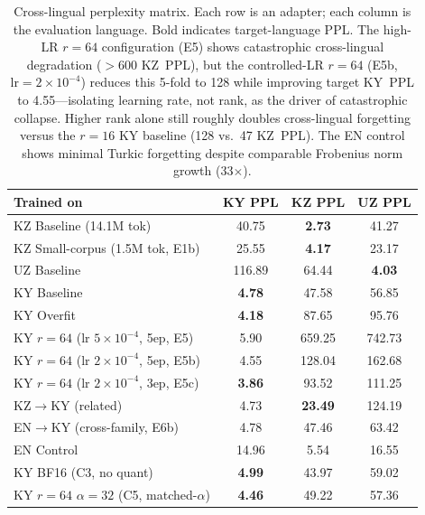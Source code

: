 \documentclass[11pt]{article}
\begin{document}
\begin{table}[t]
\centering
\small
\begin{tabular}{lccc}
\toprule
\textbf{Trained on} & \textbf{KY PPL} & \textbf{KZ PPL} & \textbf{UZ PPL} \\
\midrule
KZ Baseline (14.1M tok) & 40.75 & \textbf{2.73} & 41.27 \\
KZ Small-corpus (1.5M tok, E1b) & 25.55 & \textbf{4.17} & 23.17 \\
UZ Baseline & 116.89 & 64.44 & \textbf{4.03} \\
KY Baseline & \textbf{4.78} & 47.58 & 56.85 \\
KY Overfit & \textbf{4.18} & 87.65 & 95.76 \\
KY $r{=}64$ (lr $5{\times}10^{-4}$, 5ep, E5) & 5.90 & 659.25 & 742.73 \\
KY $r{=}64$ (lr $2{\times}10^{-4}$, 5ep, E5b) & 4.55 & 128.04 & 162.68 \\
KY $r{=}64$ (lr $2{\times}10^{-4}$, 3ep, E5c) & \textbf{3.86} & 93.52 & 111.25 \\
KZ$\rightarrow$KY (related) & 4.73 & \textbf{23.49} & 124.19 \\
EN$\rightarrow$KY (cross-family, E6b) & 4.78 & 47.46 & 63.42 \\
\midrule
EN Control & 14.96 & 5.54 & 16.55 \\
KY BF16 (C3, no quant) & \textbf{4.99} & 43.97 & 59.02 \\
KY $r{=}64$ $\alpha{=}32$ (C5, matched-$\alpha$) & \textbf{4.46} & 49.22 & 57.36 \\
\bottomrule
\end{tabular}
\caption{Cross-lingual perplexity matrix. Each row is an adapter; each column is the evaluation language. Bold indicates target-language PPL. The high-LR $r{=}64$ configuration (E5) shows catastrophic cross-lingual degradation ($>600$ KZ~PPL), but the controlled-LR $r{=}64$ (E5b, $\text{lr}{=}2{\times}10^{-4}$) reduces this 5-fold to 128 while improving target KY~PPL to 4.55---isolating learning rate, not rank, as the driver of catastrophic collapse. Higher rank alone still roughly doubles cross-lingual forgetting versus the $r{=}16$ KY baseline (128 vs.\ 47 KZ~PPL). The EN control shows minimal Turkic forgetting despite comparable Frobenius norm growth (33$\times$).}
\label{tab:cross_ppl}
\end{table}
\end{document}
